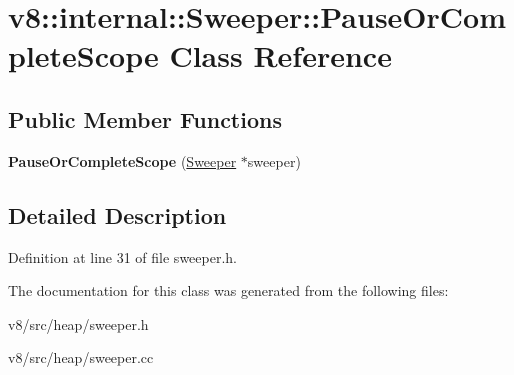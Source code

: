 \hypertarget{classv8_1_1internal_1_1Sweeper_1_1PauseOrCompleteScope}{}\section{v8\+:\+:internal\+:\+:Sweeper\+:\+:Pause\+Or\+Complete\+Scope Class Reference}
\label{classv8_1_1internal_1_1Sweeper_1_1PauseOrCompleteScope}
\subsection*{Public Member Functions}
\begin{DoxyCompactItemize}
\item 
\mbox{\label{classv8_1_1internal_1_1Sweeper_1_1PauseOrCompleteScope_afcd32ed8f127586c6fe7d7c50a52932e}} 
{\bfseries Pause\+Or\+Complete\+Scope} (\mbox{\hyperlink{classv8_1_1internal_1_1Sweeper}{Sweeper}} $\ast$sweeper)
\end{DoxyCompactItemize}


\subsection{Detailed Description}


Definition at line 31 of file sweeper.\+h.



The documentation for this class was generated from the following files\+:\begin{DoxyCompactItemize}
\item 
v8/src/heap/sweeper.\+h\item 
v8/src/heap/sweeper.\+cc\end{DoxyCompactItemize}
